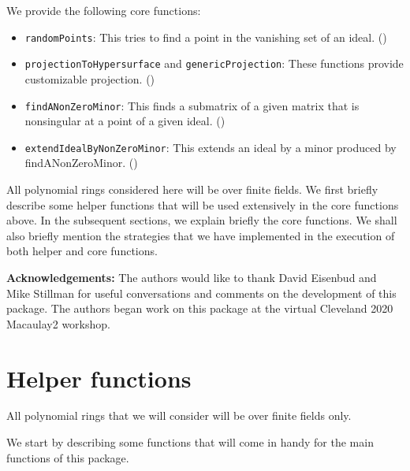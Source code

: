 \documentclass[11pt]{amsart}
\theoremstyle{definition}
\begin{document}
 We provide the following core functions:
 \begin{itemize}
	\item {\tt randomPoints}:  This tries to find a point in the vanishing set of an ideal. ()
 	\item {\tt projectionToHypersurface} and {\tt genericProjection}: These functions provide customizable projection. () 	
    \item {\tt findANonZeroMinor}:  This finds a submatrix of a given matrix that is nonsingular at a point of a given ideal. ()          
	\item {\tt extendIdealByNonZeroMinor}:  This extends an ideal by a minor produced by findANonZeroMinor. ()	
 \end{itemize}
 
All polynomial rings considered here will be over finite fields. We first briefly describe some helper functions that will be used extensively in the core functions above. In the subsequent sections, we explain briefly the core functions. We shall also briefly mention the strategies that we have implemented in the execution of both helper and core functions.

\vspace{1em}
\noindent \textbf{Acknowledgements:} The authors would like to thank David Eisenbud and Mike Stillman for useful conversations and comments on the development of this package.  The authors began work on this package at the virtual Cleveland 2020 Macaulay2 workshop.

\section{Helper functions}{\label{helper}}

All polynomial rings that we will consider will be over finite fields only. 

We start by describing some functions that will come in handy for the main functions of this package. 
\end{document}
